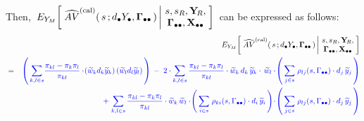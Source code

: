 \begin{lemma}
\begin{enumerate}
\begin{eqnarray*}
    \end{eqnarray*}
    Then,
    \,$
    E_{Y_{M}}\!\left[\;
        \widehat{AV}^{\textnormal{(cal)}}(\,s\,;d_{\bullet}Y_{\bullet},\mathbf{\Gamma}_{\bullet\bullet}\,)
        \left\vert\!
        \begin{array}{c} s,s_{R},\mathbf{Y}_{\!R}, \\ \mathbf{\Gamma}_{\bullet\bullet},\mathbf{X}_{\bullet\bullet} \end{array}
        \right.
        \!\!\right]
    $\,
    can be expressed as follows:
    \begin{eqnarray*}
    &&
        E_{Y_{M}}\!\left[\;
            \widehat{AV}^{\textnormal{(cal)}}(\,s\,;\dYdot,\Gdotdot\,)
            \left\vert\!
            \begin{array}{c} s,s_{R},\YsubR, \\ \Gdotdot,\Xobs \end{array}
            \right.
            \!\!\right]
    \\
    & = &
        {\color{blue}
        \left(\,
            \underset{k,l \in s}{\sum}
            \dfrac{\pi_{kl} - \pi_{k}\pi_{l}}{\pi_{kl}}
            \cdot\!
            \left(\widetilde{w}_{k}d_{k}\widetilde{y}_{k}\right)
            \left(\widetilde{w}_{l}d_{l}\widetilde{y}_{l}\right)
            \,\right)
        \, - \; 2 \cdot
        \underset{k,l \in s}{\sum}\,
        \dfrac{\pi_{kl} - \pi_{k}\pi_{l}}{\pi_{kl}}
        \cdot
        \widetilde{w}_{k}\,d_{k}\,\widetilde{y}_{k}
        \cdot
        \,\widetilde{w}_{l}
        \cdot\!
        \left(\,
            \underset{j \in s}{\sum}\;
            \rho_{lj}(s,\gdotdot)
            \cdot
            d_{j}\,\widetilde{y}_{j}
            \,\right)
        }
    \\
    &&
        {\color{blue}
        \; + \;
        \underset{k,l \in s}{\sum}\,
        \dfrac{\pi_{kl} - \pi_{k}\pi_{l}}{\pi_{kl}}
        \cdot
        \widetilde{w}_{k}\,\widetilde{w}_{l}
        \cdot\!
        \left(\,
            \underset{i \in s}{\sum}\;
            \rho_{ki}(s,\gdotdot)
            \cdot
            d_{i}\,\widetilde{y}_{i}
            \,\right)
        \!\cdot\!
        \left(\,
            \underset{j \in s}{\sum}\;
            \rho_{lj}(s,\gdotdot)
            \cdot
            d_{j}\,\widetilde{y}_{j}
            \,\right)
        }
    \\

\end{eqnarray*}
\end{enumerate}
\end{lemma}
